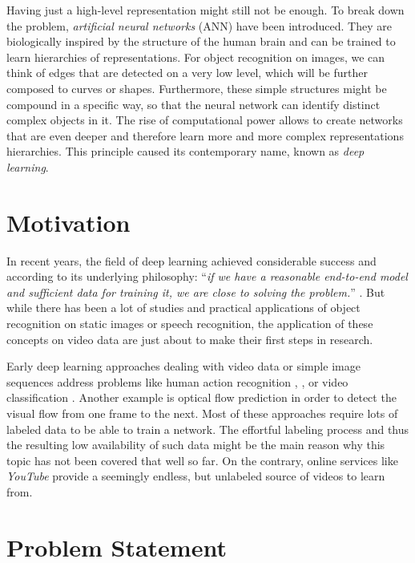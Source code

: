 Having just a high-level representation might still not be enough. To break down the problem, \textit{artificial neural networks} (ANN) have been introduced. They are biologically inspired by the structure of the human brain \parencite{ann} and can be trained to learn hierarchies of representations. For object recognition on images, we can think of edges that are detected on a very low level, which will be further composed to curves or shapes. Furthermore, these simple structures might be compound in a specific way, so that the neural network can identify distinct complex objects in it. The rise of computational power allows to create networks that are even deeper and therefore learn more and more complex representations hierarchies. This principle caused its contemporary name, known as \textit{deep learning}.

\section{Motivation}

In recent years, the field of deep learning achieved considerable success and according to its underlying philosophy: ``\textit{if we have a reasonable end-to-end model and sufficient data for training it, we are close to solving the problem.}'' \parencite{conv_lstm_nowcasting}. But while there has been a lot of studies and practical applications of object recognition on static images or speech recognition, the application of these concepts on video data are just about to make their first steps in research. 

Early deep learning approaches dealing with video data or simple image sequences address problems like human action recognition \parencite{conv3d_action_class}, \parencite{two_stream_action}, \parencite{longterm_rec_recog} or video classification \parencite{large_video_class}. Another example is optical flow prediction \parencite{flownet} in order to detect the visual flow from one frame to the next. Most of these approaches require lots of labeled data to be able to train a network. The effortful labeling process and thus the resulting low availability of such data might be the main reason why this topic has not been covered that well so far. On the contrary, online services like \textit{YouTube} provide a seemingly endless, but unlabeled source of videos to learn from.


\section{Problem Statement}

